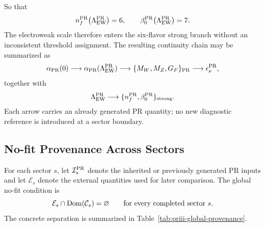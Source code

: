 \documentclass[11pt]{article}
\begin{document}
So that
\begin{equation}
n_f^{\rm PR}\!
\left(\Lambda_{\rm EW}^{\rm PR}\right)
=
6,
\qquad
\beta_0^{\rm PR}\!
\left(\Lambda_{\rm EW}^{\rm PR}\right)
=
7.
\end{equation}
The electroweak scale therefore enters the six-flavor strong branch without an inconsistent threshold assignment. The resulting continuity chain may be summarized as
\begin{equation}
\alpha_{\rm PR}(0)
\longrightarrow
\alpha_{\rm PR}(\Lambda_{\rm EW}^{\rm PR})
\longrightarrow
\{M_W,M_Z,G_F\}_{\rm PR}
\longrightarrow
\epsilon_{\nu}^{\rm PR},
\end{equation}
together with
\begin{equation}
\Lambda_{\rm EW}^{\rm PR}
\longrightarrow
\{n_f^{\rm PR},\beta_0^{\rm PR}\}_{\rm strong}.
\end{equation}
Each arrow carries an already generated PR quantity; no new diagnostic reference is introduced at a sector boundary.

\subsection{No-fit Provenance Across Sectors}
\label{subsec:priii-global-no-fit-provenance}

For each sector \(s\), let \(\mathcal I_s^{\rm PR}\) denote the inherited or previously generated PR inputs and let \(\mathcal E_s\) denote the external quantities used for later comparison.  The global no-fit condition is
\begin{equation}
\mathcal E_s
\cap
{\rm Dom}(\mathcal C_s)
=
\varnothing
\qquad
\text{for every completed sector }s.
\label{eq:priii-global-no-fit-condition}
\end{equation}
The concrete separation is summarized in Table~\ref{tab:priii-global-provenance}.
\end{document}
